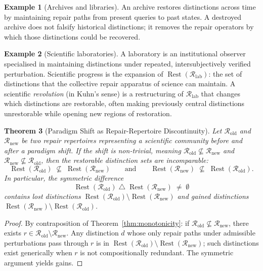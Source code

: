 \documentclass[12pt, oneside]{article}
\theoremstyle{plain}
\newtheorem{theorem}{Theorem}[section]
\theoremstyle{definition}
\newtheorem{example}[theorem]{Example}
\theoremstyle{remark}
\theoremstyle{definition}
\DeclareMathOperator{\Rest}{Rest}
\begin{document}
\begin{example}[Archives and libraries]
  An archive restores distinctions across time by maintaining repair
  paths from present queries to past states.
  A destroyed archive does not falsify historical distinctions; it
  removes the repair operators by which those distinctions could be
  recovered.
\end{example}

\begin{example}[Scientific laboratories]
  A laboratory is an institutional observer specialised in maintaining
  distinctions under repeated, intersubjectively verified perturbation.
  Scientific progress is the expansion of $\Rest(\mathcal{R}_{\mathrm{lab}})$:
  the set of distinctions that the collective repair apparatus of
  science can maintain.
  A scientific \emph{revolution} (in Kuhn's sense) is a restructuring
  of $\mathcal{R}_{\mathrm{lab}}$ that changes which distinctions are
  restorable, often making previously central distinctions
  unrestorable while opening new regions of restoration.
\end{example}

\begin{theorem}[Paradigm Shift as Repair-Repertoire Discontinuity]
  Let $\mathcal{R}_{\mathrm{old}}$ and $\mathcal{R}_{\mathrm{new}}$
  be two repair repertoires representing a scientific community before
  and after a paradigm shift.
  If the shift is \emph{non-trivial}, meaning
  $\mathcal{R}_{\mathrm{old}} \not\subseteq \mathcal{R}_{\mathrm{new}}$
  and
  $\mathcal{R}_{\mathrm{new}} \not\subseteq \mathcal{R}_{\mathrm{old}}$,
  then the restorable distinction sets are incomparable:
  \[
    \Rest(\mathcal{R}_{\mathrm{old}})
    \;\not\subseteq\;
    \Rest(\mathcal{R}_{\mathrm{new}})
    \qquad\text{and}\qquad
    \Rest(\mathcal{R}_{\mathrm{new}})
    \;\not\subseteq\;
    \Rest(\mathcal{R}_{\mathrm{old}}).
  \]
  In particular, the symmetric difference
  \[
    \Rest(\mathcal{R}_{\mathrm{old}})
    \;\triangle\;
    \Rest(\mathcal{R}_{\mathrm{new}})
    \;\neq\; \emptyset
  \]
  contains \emph{lost distinctions}
  $\Rest(\mathcal{R}_{\mathrm{old}}) \setminus
  \Rest(\mathcal{R}_{\mathrm{new}})$
  and \emph{gained distinctions}
  $\Rest(\mathcal{R}_{\mathrm{new}}) \setminus
  \Rest(\mathcal{R}_{\mathrm{old}})$.
  \label{thm:paradigm}
\end{theorem}

\begin{proof}
  By contraposition of Theorem~\ref{thm:monotonicity}: if
  $\mathcal{R}_{\mathrm{old}} \not\subseteq \mathcal{R}_{\mathrm{new}}$,
  there exists $r \in \mathcal{R}_{\mathrm{old}} \setminus
  \mathcal{R}_{\mathrm{new}}$.
  Any distinction $d$ whose only repair paths under admissible
  perturbations pass through $r$ is in
  $\Rest(\mathcal{R}_{\mathrm{old}}) \setminus
  \Rest(\mathcal{R}_{\mathrm{new}})$; such distinctions exist
  generically when $r$ is not compositionally redundant.
  The symmetric argument yields gains.
\end{proof}
\end{document}

